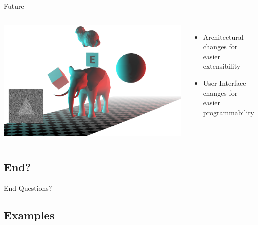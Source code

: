 \documentclass[12pt,ucs,hyperref={pdftext}]{beamer}
\newlength{\columnleft}
\newlength{\columnright}
\begin{document}
\begin{frame}{Future}
\begin{columns}

\column{\columnleft}
\includegraphics[width=\columnleft]{media/title.png}

\column{\columnright}
\begin{itemize}%
\item Architectural changes for easier extensibility
\item User Interface changes for easier programmability
\end{itemize}

\end{columns}
\end{frame}


\appendix


\subsection{End?}
\begin{frame}{End}
Questions?
\end{frame}

\subsection{Examples}
\end{document}
